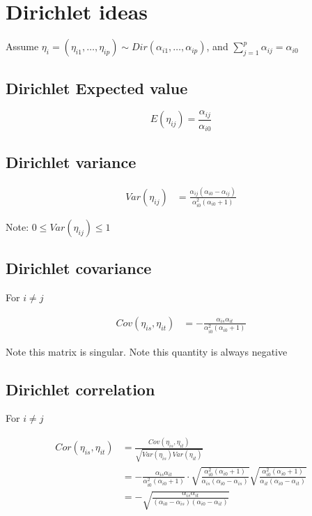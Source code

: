 \documentclass[10pt]{article}
\theoremstyle{definition}
\begin{document}
\section{Dirichlet ideas }

Assume $\eta_i = (\eta_{i1}, \ldots , \eta_{ip}) \sim Dir(\alpha_{i1}, \ldots , \alpha_{ip})$, and $\sum_{j=1}^p \alpha_{ij} = \alpha_{i0}$

\subsection{Dirichlet Expected value}

\[E(\eta_{ij}) = \frac{\alpha_{ij}}{\alpha_{i0}} \]


\subsection{Dirichlet variance }

\begin{align*}
  Var(\eta_{ij}) &= \frac{\alpha_{ij}(\alpha_{i0} - \alpha_{ij})}{\alpha_{i0}^2(\alpha_{i0} + 1)}
\end{align*}

Note: $0 \leq Var(\eta_{ij}) \leq 1$

\subsection{Dirichlet covariance }

For $i \neq j$

\begin{align*}
  Cov(\eta_{is}, \eta_{it}) &=  - \frac{\alpha_{is}\alpha_{it}}{\alpha_{i0}^2(\alpha_{i0} + 1)}
\end{align*}


Note this matrix is singular.
Note this quantity is always negative

\subsection{Dirichlet correlation }

For $i \neq j$

\begin{align*}
  Cor(\eta_{is}, \eta_{it}) &= \frac{Cov(\eta_{is}, \eta_{it})}{\sqrt{Var(\eta_{is})Var(\eta_{it})}}\\
  &= -  \frac{\alpha_{is}\alpha_{it}}{\alpha_{i0}^2(\alpha_{i0} + 1)} \cdot \sqrt{\frac{\alpha_{i0}^2(\alpha_{i0} + 1)}{\alpha_{is}(\alpha_{i0} - \alpha_{is})}}\sqrt{\frac{\alpha_{i0}^2(\alpha_{i0} + 1)}{\alpha_{it}(\alpha_{i0} - \alpha_{it})}}\\
  &= - \sqrt{\frac{\alpha_{is}\alpha_{it}}{(\alpha_{i0} - \alpha_{is})(\alpha_{i0} - \alpha_{it})}}
\end{align*}
\end{document}
